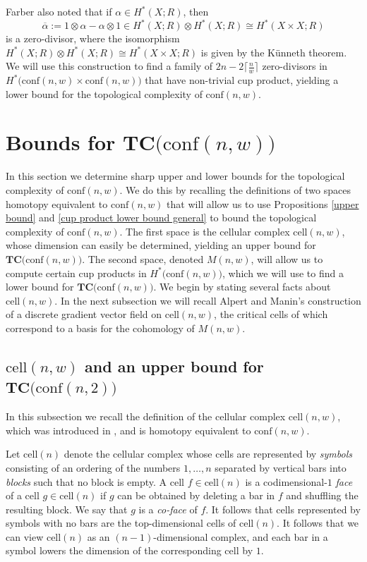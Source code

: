 \documentclass[pagebackref,colorlinks,citecolor=blue,linkcolor=blue,urlcolor=blue,filecolor=blue]{article}
\theoremstyle{definition}\newtheorem{definition}[thm]{Definition}
\theoremstyle{definition}
\begin{document}
Farber also noted that if $\alpha\in H^{*}(X;R)$, then
\[
\overline{\alpha}:=1\otimes \alpha-\alpha\otimes 1\in H^{*}(X;R)\otimes H^{*}(X;R)\cong H^{*}(X\times X;R)
\]
is a zero-divisor, where the isomorphism $H^{*}(X;R)\otimes H^{*}(X;R)\cong H^{*}(X\times X;R)$ is given by the K\"{u}nneth theorem.
We will use this construction to find a family of $2n-2\big\lceil\frac{n}{w}\big\rceil$ zero-divisors in $H^{*}\big(\text{conf}(n,w)\times \text{conf}(n,w)\big)$ that have non-trivial cup product, yielding a lower bound for the topological complexity of $\text{conf}(n,w)$.

\section{Bounds for $\textbf{TC}\big(\text{conf}(n,w)\big)$}
In this section we determine sharp upper and lower bounds for the topological complexity of $\text{conf}(n,w)$.
We do this by recalling the definitions of two spaces homotopy equivalent to $\text{conf}(n,w)$ that will allow us to use Propositions \ref{upper bound} and \ref{cup product lower bound general} to bound the topological complexity of $\text{conf}(n,w)$.
The first space is the cellular complex $\text{cell}(n,w)$, whose dimension can easily be determined, yielding an upper bound for $\textbf{TC}\big(\text{conf}(n,w)\big)$.
The second space, denoted $M(n,w)$, will allow us to compute certain cup products in $H^{*}\big(\text{conf}(n,w)\big)$, which we will use to find a lower bound for  $\textbf{TC}\big(\text{conf}(n,w)\big)$.
We begin by stating several facts about $\text{cell}(n,w)$.
In the next subsection we will recall Alpert and Manin's construction of a discrete gradient vector field on $\text{cell}(n,w)$, the critical cells of which correspond to a basis for the cohomology of $M(n,w)$.

\subsection{$\text{cell}(n,w)$ and an upper bound for $\textbf{TC}\big(\text{conf}(n,2)\big)$}

In this subsection we recall the definition of the cellular complex $\text{cell}(n,w)$,  which was introduced in \cite{blagojevic2014convex}, and is homotopy equivalent to $\text{conf}(n,w)$.

Let \emph{$\text{cell}(n)$} denote the cellular complex whose cells are represented by \emph{symbols} consisting of an ordering of the numbers $1, \dots, n$ separated by vertical bars into \emph{blocks} such that no block is empty. 
A cell $f\in \text{cell}(n)$ is a codimensional-$1$ \emph{face} of a cell $g\in \text{cell}(n)$ if $g$ can be obtained by deleting a bar in $f$ and shuffling the resulting block.
We say that $g$ is a \emph{co-face} of $f$.
It follows that cells represented by symbols with no bars are the top-dimensional cells of $\text{cell}(n)$.
It follows that we can view $\text{cell}(n)$ as an $(n-1)$-dimensional complex, and each bar in a symbol lowers the dimension of the corresponding cell by $1$.
\end{document}
